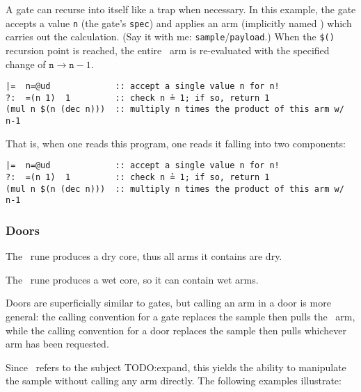 A gate can recurse into itself like a trap when necessary.  In this example, the gate accepts a value \texttt{n} (the gate's \texttt{spec}) and applies an arm (implicitly named \buc) which carries out the calculation.  (Say it with me:  \texttt{sample}/\texttt{payload}.)  When the \texttt{\$()} recursion point is reached, the entire \buc~arm is re-evaluated with the specified change of $\texttt{n} \rightarrow \texttt{n} - 1$.

\begin{lstlisting}[language=hoon,
                   caption={Calculating a factorial using recursion.  (Example from Tlon documentation.)}]
|=  n=@ud             :: accept a single value n for n!
?:  =(n 1)  1         :: check n ≟ 1; if so, return 1
(mul n $(n (dec n)))  :: multiply n times the product of this arm w/ n-1
\end{lstlisting}

That is, when one reads this program, one reads it falling into two components:

\begin{lstlisting}[language=hoon,
                   style=nonumbers]
|=  n=@ud             :: accept a single value n for n!
?:  =(n 1)  1         :: check n ≟ 1; if so, return 1
(mul n $(n (dec n)))  :: multiply n times the product of this arm w/ n-1
\end{lstlisting}



\subsubsection{Doors}

\barcab

The \pbarcen~rune produces a dry core, thus all arms it contains are dry.

The \pbarpat~rune produces a wet core, so it can contain wet arms.

Doors are superficially similar to gates, but calling an arm in a door is more general:  the calling convention for a gate replaces the sample then pulls the \buc~arm, while the calling convention for a door replaces the sample then pulls whichever arm has been requested.

Since \dot~refers to the subject TODO:expand, this yields the ability to manipulate the sample without calling any arm directly.  The following examples illustrate:

